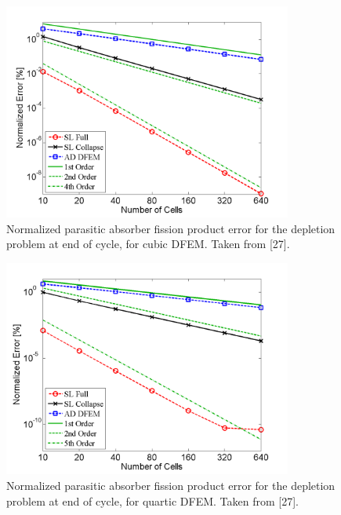 \newpage

\begin{figure}[!htp]
\centering
\includegraphics[width=9.5cm]{chapter5_depletion/FPA_P3_norm_err.png}
\caption{Normalized parasitic absorber fission product error for the depletion problem at end of cycle, for cubic DFEM.  Taken from [27].}
\label{fig:depletion_NFPA_p3}
\end{figure}
%
\begin{figure}[!hbp]
\centering
\includegraphics[width=9.5cm]{chapter5_depletion/FPA_P4_norm_err.png}
\caption{Normalized parasitic absorber fission product error for the depletion problem at end of cycle, for quartic DFEM.  Taken from [27].}
\label{fig:depletion_NFPA_p4}
\end{figure}  

\newpage

